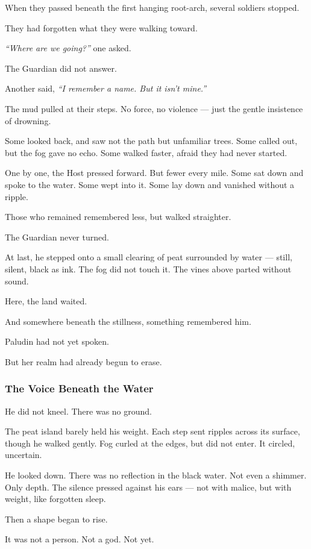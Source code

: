\documentclass[12pt]{article}
\begin{document}
When they passed beneath the first hanging root-arch, several soldiers stopped.

They had forgotten what they were walking toward.

\textit{``Where are we going?''} one asked.

The Guardian did not answer.

Another said, \textit{``I remember a name. But it isn't mine.''}

The mud pulled at their steps. No force, no violence — just the gentle insistence of drowning.

Some looked back, and saw not the path but unfamiliar trees. Some called out, but the fog gave no echo. Some walked faster, afraid they had never started.

One by one, the Host pressed forward. But fewer every mile. Some sat down and spoke to the water. Some wept into it. Some lay down and vanished without a ripple.

Those who remained remembered less, but walked straighter.

The Guardian never turned.

At last, he stepped onto a small clearing of peat surrounded by water — still, silent, black as ink. The fog did not touch it. The vines above parted without sound.

Here, the land waited.

And somewhere beneath the stillness, something remembered him.

Paludin had not yet spoken.

But her realm had already begun to erase.

\dotfill

\subsubsection{The Voice Beneath the Water}

He did not kneel. There was no ground.

The peat island barely held his weight. Each step sent ripples across its surface, though he walked gently. Fog curled at the edges, but did not enter. It circled, uncertain.

He looked down. There was no reflection in the black water. Not even a shimmer. Only depth. The silence pressed against his ears — not with malice, but with weight, like forgotten sleep.

Then a shape began to rise.

It was not a person. Not a god. Not yet.
\end{document}
